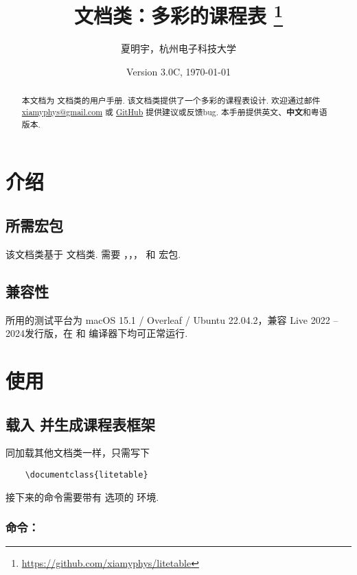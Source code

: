 \documentclass[letterpaper]{l3doc}
\title{
    \cls{litetable} 文档类：多彩的课程表
    \thanks{\url{https://github.com/xiamyphys/litetable}}
}
\author{夏明宇，杭州电子科技大学}
\affil{\href{mailto:xiamyphys@gmail.com}{xiamyphys@gmail.com}}
\date{Version 3.0C, \today}
\begin{document}
\maketitle

\begin{abstract}
    本文档为  文档类的用户手册. 该文档类提供了一个多彩的课程表设计. 欢迎通过邮件 \href{mailto:xiamyphys@gmail.com}{xiamyphys@gmail.com} 或 \href{https://github.com/xiamyphys/litetable/issues}{GitHub} 提供建议或反馈bug. 本手册提供英文、\textbf{中文}和粤语版本.
\end{abstract}

\section{介绍}

\subsection{所需宏包}

该文档类基于  文档类. 需要 ，，， 和  宏包. 

\subsection{兼容性}

所用的测试平台为 macOS 15.1 / Overleaf / Ubuntu 22.04.2，兼容 Live 2022 -- 2024发行版，在  和  编译器下均可正常运行.

\section{使用}

\subsection{载入  并生成课程表框架}

同加载其他文档类一样，只需写下

\begin{Verbatim}
    \documentclass{litetable}
\end{Verbatim}

接下来的命令需要带有  选项的  环境.

\subsubsection{命令：}
\end{document}
